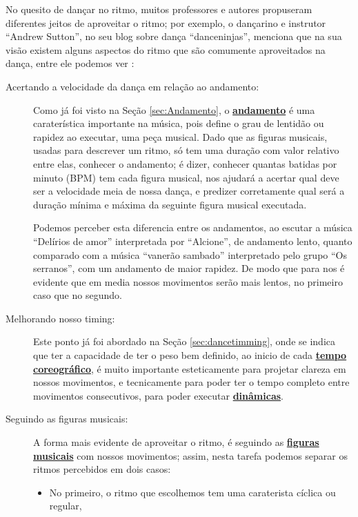 No quesito de dançar no ritmo, muitos professores e autores propuseram diferentes jeitos de aproveitar o ritmo; 
por exemplo, o dançarino e instrutor ``Andrew Sutton'', 
no seu blog sobre dança ``danceninjas'',
menciona que na sua visão existem alguns aspectos do ritmo que são comumente aproveitados na dança,
entre ele podemos ver \cite{AndrewSuttonRitmo1}:  
\begin{description}
\item [Acertando a velocidade da dança em relação ao andamento:]
Como já foi visto na Seção \ref{sec:Andamento},
o \hyperref[sec:Andamento]{\textbf{andamento}} é uma caraterística importante na música,
pois define o grau de lentidão ou rapidez ao executar,
uma peça musical. 
Dado que as figuras musicais, usadas para descrever um ritmo, 
só tem uma duração com valor relativo entre elas,
conhecer o andamento; é dizer, conhecer quantas batidas por minuto (BPM) tem cada figura musical,
nos ajudará a acertar qual deve ser a velocidade meia de nossa dança,
e predizer corretamente qual será a duração mínima e máxima da seguinte figura musical executada.
\begin{example}
Podemos perceber esta diferencia entre os andamentos, 
ao escutar a música ``Delírios de amor'' interpretada por ``Alcione'', 
de andamento lento, 
quanto comparado com a música ``vanerão sambado'' interpretado pelo grupo ``Os serranos'', 
com um andamento de maior rapidez.
De modo que para nos é evidente que em media nossos movimentos serão mais lentos,
no primeiro caso que no segundo.
\end{example}
\item [Melhorando nosso timing:]
Este ponto já foi abordado na Seção \ref{sec:dancetimming},
onde se indica que ter a capacidade de ter o peso bem definido,
ao inicio de cada \hyperref[sec:TemposCoreograficos]{\textbf{tempo coreográfico}}, 
é muito importante esteticamente para projetar clareza em nossos movimentos,
e tecnicamente para poder ter o tempo completo entre movimentos consecutivos,
para poder executar \hyperref[sec:musicalidade:dinamicas]{\textbf{dinâmicas}}.
\item [Seguindo as figuras musicais:]
A forma mais evidente de aproveitar o ritmo, 
é seguindo as \hyperref[sec:figurasmusicais]{\textbf{figuras musicais}} com nossos movimentos;
assim, nesta tarefa podemos separar os ritmos percebidos em dois casos:
\begin{itemize} 
\item No primeiro, o ritmo que escolhemos tem uma caraterista cíclica ou regular,

\end{itemize}
\end{description}
